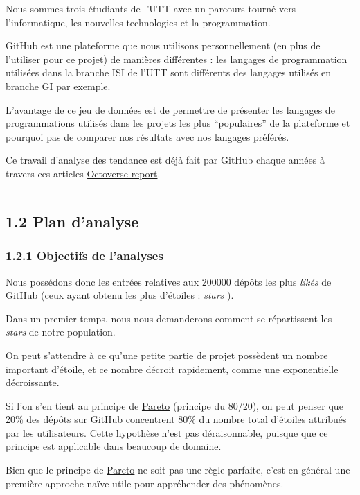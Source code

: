 \documentclass[
]{article}
\begin{document}
Nous sommes trois étudiants de l'UTT avec un parcours tourné vers
l'informatique, les nouvelles technologies et la programmation.

GitHub est une plateforme que nous utilisons personnellement (en plus de
l'utiliser pour ce projet) de manières différentes : les langages de
programmation utilisées dans la branche ISI de l'UTT sont différents des
langages utilisés en branche GI par exemple.

L'avantage de ce jeu de données est de permettre de présenter les
langages de programmations utilisés dans les projets les plus
``populaires'' de la plateforme et pourquoi pas de comparer nos
résultats avec nos langages préférés.

Ce travail d'analyse des tendance est déjà fait par GitHub chaque années
à travers ces articles \href{https://octoverse.github.com/}{Octoverse
report}.

\begin{center}\rule{0.5\linewidth}{0.5pt}\end{center}

\subsection{1.2 Plan d'analyse}\label{plan-danalyse}

\subsubsection{1.2.1 Objectifs de
l'analyses}\label{objectifs-de-lanalyses}

Nous possédons donc les entrées relatives aux 200000 dépôts les plus
\emph{likés} de GitHub (ceux ayant obtenu les plus d'étoiles :
\emph{stars} ).

Dans un premier temps, nous nous demanderons comment se répartissent les
\emph{stars} de notre population.

On peut s'attendre à ce qu'une petite partie de projet possèdent un
nombre important d'étoile, et ce nombre décroit rapidement, comme une
exponentielle décroissante.

Si l'on s'en tient au principe de
\href{https://fr.wikipedia.org/wiki/Principe_de_Pareto}{Pareto}
(principe du 80/20), on peut penser que 20\% des dépôts sur GitHub
concentrent 80\% du nombre total d'étoiles attribués par les
utilisateurs. Cette hypothèse n'est pas déraisonnable, puisque que ce
principe est applicable dans beaucoup de domaine.

Bien que le principe de
\href{https://fr.wikipedia.org/wiki/Principe_de_Pareto}{Pareto} ne soit
pas une règle parfaite, c'est en général une première approche naïve
utile pour appréhender des phénomènes.
\end{document}
